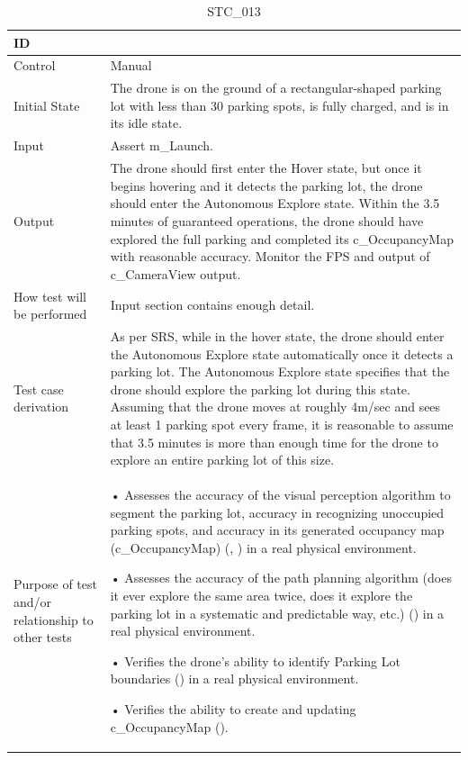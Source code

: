 \documentclass[12pt, titlepage]{article}
\begin{document}
\begin{table}[!h]
\begin{center}
\caption {STC\_013}
\label{tab:STC_013}
\begin{tabular}{ | m{1.5cm} | m{15cm} | } 
\hline
ID & \nameref{tab:STC_013} \\ 
\hline
Control & Manual \\ 
\hline
Initial State & The drone is on the ground of a rectangular-shaped parking lot with less than 30 parking spots, is fully charged, and is in its idle state.  \\ 
\hline
Input & Assert m\_Launch. \\ 
\hline
Output & The drone should first enter the Hover state, but once it begins hovering and it detects the parking lot, the drone should enter the Autonomous Explore state. Within the 3.5 minutes of guaranteed operations, the drone should have explored the full parking and completed its c\_OccupancyMap with reasonable accuracy. 
Monitor the FPS and output of c\_CameraView output. \\ 
\hline
How test will be performed & Input section contains enough detail. \\ 
\hline
Test case derivation & As per SRS, while in the hover state, the drone should enter the Autonomous Explore state automatically once it detects a parking lot. The Autonomous Explore state specifies that the drone should explore the parking lot during this state. Assuming that the drone moves at roughly 4m/sec and sees at least 1 parking spot every frame, it is reasonable to assume that 3.5 minutes is more than enough time for the drone to explore an entire parking lot of this size.
 \\ 
\hline
Purpose of test and/or relationship to other tests & 
\item • Assesses the accuracy of the visual perception algorithm to segment the parking lot, accuracy in recognizing unoccupied parking spots, and accuracy in its generated occupancy map (c\_OccupancyMap) (\nameref{GEN_005}, \nameref{GEN_006}) in a real physical environment.

• Assesses the accuracy of the path planning algorithm (does it ever explore the same area twice, does it explore the parking lot in a systematic and predictable way, etc.) (\nameref{STA_003}) in a real physical environment.

• Verifies the drone’s ability to identify Parking Lot boundaries (\nameref{GEN_001}) in a real physical environment.

• Verifies the ability to create and updating c_OccupancyMap (\nameref{GEN_002}).


\end{tabular}
\end{center}
\end{table}
\end{document}

